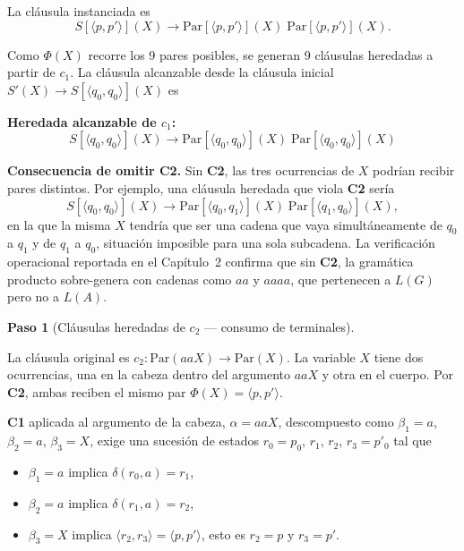 \documentclass[11pt, letterpaper]{article}
\theoremstyle{definition}
\newtheorem{paso}{Paso}
\newcommand{\pair}[2]{\langle #1, #2 \rangle}
\newcommand{\trans}{\delta}
\newcommand{\Par}{\mathrm{Par}}
\begin{document}
La cláusula instanciada es
\[
S[\pair{p}{p'}](X) \to \Par[\pair{p}{p'}](X) \; \Par[\pair{p}{p'}](X).
\]

Como $\Phi(X)$ recorre los 9 pares posibles, se generan 9 cláusulas heredadas a partir de $c_1$. La cláusula alcanzable desde la cláusula inicial $S'(X) \to S[\pair{q_0}{q_0}](X)$ es

\begin{tcolorbox}[colback=green!10, colframe=green!50!black]
\textbf{Heredada alcanzable de $c_1$:}
\[
S[\pair{q_0}{q_0}](X) \to \Par[\pair{q_0}{q_0}](X) \; \Par[\pair{q_0}{q_0}](X)
\]
\end{tcolorbox}

\begin{tcolorbox}
\textbf{Consecuencia de omitir \textbf{C2}.} Sin \textbf{C2}, las tres ocurrencias de $X$ podrían recibir pares distintos. Por ejemplo, una cláusula heredada que viola \textbf{C2} sería
\[
S[\pair{q_0}{q_0}](X) \to \Par[\pair{q_0}{q_1}](X) \; \Par[\pair{q_1}{q_0}](X),
\]
en la que la misma $X$ tendría que ser una cadena que vaya simultáneamente de $q_0$ a $q_1$ y de $q_1$ a $q_0$, situación imposible para una sola subcadena. La verificación operacional reportada en el Capítulo~2 confirma que sin \textbf{C2}, la gramática producto sobre-genera con cadenas como $aa$ y $aaaa$, que pertenecen a $L(G)$ pero no a $L(A)$.
\end{tcolorbox}

\begin{paso}[Cláusulas heredadas de $c_2$ --- consumo de terminales]
\end{paso}

La cláusula original es $c_2: \Par(aaX) \to \Par(X)$. La variable $X$ tiene dos ocurrencias, una en la cabeza dentro del argumento $aaX$ y otra en el cuerpo. Por \textbf{C2}, ambas reciben el mismo par $\Phi(X) = \pair{p}{p'}$.

\textbf{C1} aplicada al argumento de la cabeza, $\alpha = aaX$, descompuesto como $\beta_1 = a$, $\beta_2 = a$, $\beta_3 = X$, exige una sucesión de estados $r_0 = p_0$, $r_1$, $r_2$, $r_3 = p'_0$ tal que
\begin{itemize}
\item $\beta_1 = a$ implica $\trans(r_0, a) = r_1$,
\item $\beta_2 = a$ implica $\trans(r_1, a) = r_2$,
\item $\beta_3 = X$ implica $\pair{r_2}{r_3} = \pair{p}{p'}$, esto es $r_2 = p$ y $r_3 = p'$.
\end{itemize}
\end{document}
